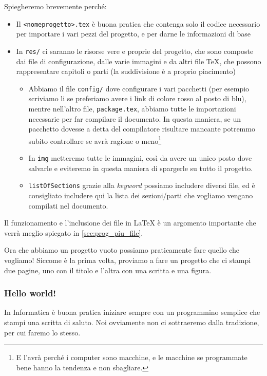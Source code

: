 Spiegheremo brevemente perché:
\begin{itemize}
  \item Il \texttt{<nomeprogetto>.tex} è buona pratica che contenga solo il
codice necessario per importare i vari pezzi del progetto, e per darne le
informazioni di base
  \item In \texttt{res/} ci saranno le risorse vere e proprie del progetto, che
sono composte dai file di configurazione, dalle varie immagini e da altri file
TeX, che possono rappresentare capitoli o parti (la suddivisione è a proprio
piacimento)
  \begin{itemize}
   \item Abbiamo il file \texttt{config/} dove configurare i vari pacchetti
(per esempio scriviamo li se preferiamo avere i link di colore rosso al posto
di blu), mentre nell'altro file, \texttt{package.tex}, abbiamo tutte le
importazioni necessarie per far compilare il documento. In questa maniera, se
un pacchetto dovesse a detta del compilatore risultare mancante potremmo subito
controllare se avrà ragione o meno\footnote{E l'avrà perché i computer sono
macchine, e le macchine se programmate bene hanno la tendenza e non sbagliare.}
  \item In \texttt{img} metteremo tutte le immagini, così da avere un unico
posto dove salvarle e eviteremo in questa maniera di spargerle su tutto il
progetto.
  \item \texttt{listOfSections} grazie alla \textit{keyword} \verb!!
possiamo includere diversi file, ed è consigliato includere qui la lista dei
sezioni/parti che vogliamo vengano compilati nel documento.
  \end{itemize}
\end{itemize}

Il funzionamento e l'inclusione dei file in \LaTeX{} è un argomento importante
che verrà meglio spiegato in \ref{sec:prog_piu_file}.

Ora che abbiamo un progetto vuoto possiamo praticamente fare quello che
vogliamo! Siccome è la prima volta, proviamo a fare un progetto che ci stampi
due pagine, uno con il titolo e l'altra con una scritta e una figura.

\subsubsection{Hello world!}

In Informatica è buona pratica iniziare sempre con un programmino semplice che
stampi una scritta di saluto. Noi ovviamente non ci sottraeremo dalla
tradizione, per cui faremo lo stesso.

